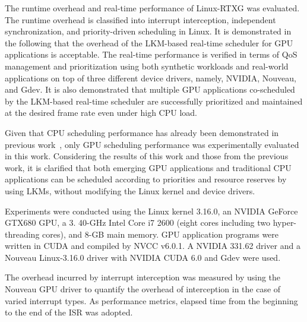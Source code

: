 \label{sec:evaluation}
The runtime overhead and real-time performance of Linux-RTXG was evaluated.
The runtime overhead is classified into interrupt interception, independent synchronization, and priority-driven scheduling in Linux.
It is demonstrated in the following that the overhead of the LKM-based real-time scheduler for GPU applications is acceptable.
The real-time performance is verified in terms of QoS management and prioritization using both synthetic workloads and real-world applications on top of three different device drivers, namely, NVIDIA, Nouveau, and Gdev.
It is also demonstrated that multiple GPU applications co-scheduled by the LKM-based real-time scheduler are successfully prioritized and maintained at the desired frame rate even under high CPU load.

Given that CPU scheduling performance has already been demonstrated in previous work~\cite{kato2009loadable}, only GPU scheduling performance was experimentally evaluated in this work.
Considering the results of this work and those from the previous work, it is clarified that both emerging GPU applications and traditional CPU applications can be scheduled according to priorities and resource reserves by using LKMs, without modifying the Linux kernel and device drivers.

Experiments were conducted using the Linux kernel 3.16.0, an NVIDIA GeForce GTX680 GPU, a 3.
40-GHz Intel Core i7 2600 (eight cores including two hyper-threading cores), and 8-GB main memory.
GPU application programs were written in CUDA and compiled by NVCC v6.0.1. A NVIDIA 331.62 driver and a Nouveau Linux-3.16.0 driver with NVIDIA CUDA 6.0 and Gdev were used.

The overhead incurred by interrupt interception was measured by using the Nouveau GPU driver to quantify the overhead of interception in the case of varied interrupt types.
As performance metrics, elapsed time from the beginning to the end of the ISR was adopted.


